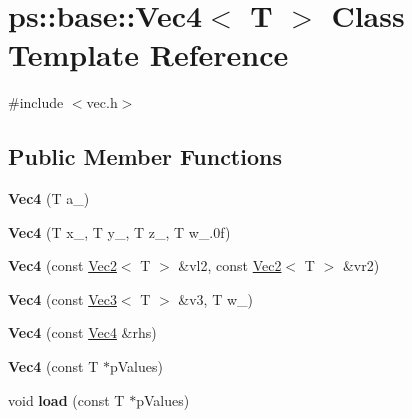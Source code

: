 \hypertarget{classps_1_1base_1_1Vec4}{}\section{ps\+:\+:base\+:\+:Vec4$<$ T $>$ Class Template Reference}
\label{classps_1_1base_1_1Vec4}


{\ttfamily \#include $<$vec.\+h$>$}

\subsection*{Public Member Functions}
\begin{DoxyCompactItemize}
\item 
\hypertarget{classps_1_1base_1_1Vec4_a9b1f1a14caa2d86b308953881df75de2}{}{\bfseries Vec4} (T a\+\_\+)\label{classps_1_1base_1_1Vec4_a9b1f1a14caa2d86b308953881df75de2}

\item 
\hypertarget{classps_1_1base_1_1Vec4_a82927e5f7fd02a7fe7c8dbe1793b7db4}{}{\bfseries Vec4} (T x\+\_\+, T y\+\_\+, T z\+\_\+, T w\+\_.\+0f)\label{classps_1_1base_1_1Vec4_a82927e5f7fd02a7fe7c8dbe1793b7db4}

\item 
\hypertarget{classps_1_1base_1_1Vec4_a1ff2e0bf2289cf851e342d744ccb412f}{}{\bfseries Vec4} (const \hyperlink{classps_1_1base_1_1Vec2}{Vec2}$<$ T $>$ \&vl2, const \hyperlink{classps_1_1base_1_1Vec2}{Vec2}$<$ T $>$ \&vr2)\label{classps_1_1base_1_1Vec4_a1ff2e0bf2289cf851e342d744ccb412f}

\item 
\hypertarget{classps_1_1base_1_1Vec4_a88e6c3ed180562b947ebee42c49e8d50}{}{\bfseries Vec4} (const \hyperlink{classps_1_1base_1_1Vec3}{Vec3}$<$ T $>$ \&v3, T w\+\_\+)\label{classps_1_1base_1_1Vec4_a88e6c3ed180562b947ebee42c49e8d50}

\item 
\hypertarget{classps_1_1base_1_1Vec4_a5c6974f4b2fd261d71e19fc8c51e79d6}{}{\bfseries Vec4} (const \hyperlink{classps_1_1base_1_1Vec4}{Vec4} \&rhs)\label{classps_1_1base_1_1Vec4_a5c6974f4b2fd261d71e19fc8c51e79d6}

\item 
\hypertarget{classps_1_1base_1_1Vec4_aa4a538b53bd7cefc269d30702a1922f1}{}{\bfseries Vec4} (const T $\ast$p\+Values)\label{classps_1_1base_1_1Vec4_aa4a538b53bd7cefc269d30702a1922f1}

\item 
\hypertarget{classps_1_1base_1_1Vec4_a24d8509e3172854af514b45b72b783ef}{}void {\bfseries load} (const T $\ast$p\+Values)\label{classps_1_1base_1_1Vec4_a24d8509e3172854af514b45b72b783ef}


\end{DoxyCompactItemize}
